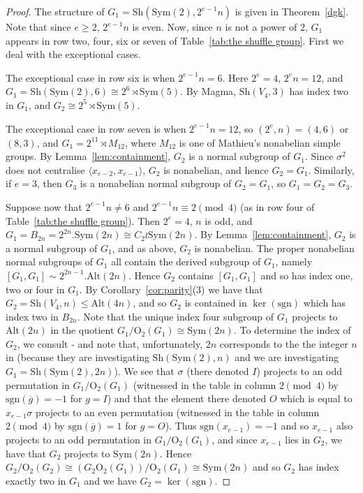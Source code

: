 \documentclass[12pt]{amsart}
\theoremstyle{remark}
\theoremstyle{definition}
\newcommand{\sym}{\mathrm{Sym}}
\newcommand{\alt}{\mathrm{Alt}}
\newcommand{\sh}{\mathrm{Sh}}
\begin{document}
\begin{proof}
The structure of $G_1= \sh(\sym(2),2^{e-1}n)$ is given in Theorem~\ref{dgk}.  Note that since $e\geqslant 2$, $2^{e-1}n$ is even. Now, since $n$ is not a power of $2$, $G_1$ appears in row two, four, six or seven of Table~\ref{tab:the shuffle group}. %
First we deal with the exceptional cases.

The exceptional case in row six  is when $2^{e-1}n=6$. Here $2^e=4$, $2^en=12$, and $G_1 = \sh(\sym(2),6) \cong 2^6 \rtimes \sym(5)$. By {\sc Magma}, $\sh(V_4,3)$ has index two in $G_1$, and $G_2 \cong 2^5 \rtimes \sym(5)$.

The exceptional case in row seven is when $2^{e-1}n = 12$, so $(2^e,n)=(4,6)$ or $(8,3)$, and $G_1= 2^{11} \rtimes M_{12}$, where $M_{12}$ is  one of  Mathieu's nonabelian simple groups. 
By Lemma~\ref{lem:containment}, $G_2$  is a normal subgroup of $G_1$.  Since $\sigma^2$ does not centralise $\langle x_{e-2}, x_{e-1}\rangle$,   $G_2$ is nonabelian, and hence $G_2=G_1$. Similarly, if $e=3$, then $G_3$ is a nonabelian normal subgroup of $G_2 = G_1$, so  $G_1 = G_2 = G_3 $.

Suppose now that $2^{e-1}n \neq 6$ and $2^{e-1}n \equiv 2 \pmod 4$ (as in row four of Table~\ref{tab:the shuffle group}). Then $2^e=4$, $n$ is odd, and $G_1 = B_{2n} = 2^{2n}.\sym(2n) \cong C_2 \wr \sym(2n)$. By Lemma~\ref{lem:containment}, $G_2$ is a normal subgroup of $G_1$, and as above, $G_2$ is nonabelian. The proper nonabelian normal subgroups of $G_1$ all contain the derived subgroup of $G_1$, namely $[G_1,G_1] \sim2^{2n-1}.\alt(2n)$. Hence $G_2$ contains $[G_1,G_1]$ and so has index one, two or four in $G_1$. By Corollary~\ref{cor:parity}(3)  we have that $G_2 = \sh(V_4,n)  \leqslant \alt(4n)$, and so $G_2$ is contained in $\ker(\mathrm{sgn})$ which has index two in $B_{2n}$. Note that the unique index four subgroup of $G_1$ projects to $\alt(2n)$ in the quotient $G_1 / \mathrm O_2(G_1) \cong \sym(2n)$. To determine the index of $G_2$, we consult \cite[Table III]{DGK} - and note that, unfortunately, $2n$ corresponds to the the integer $n$ in \cite[Table III]{DGK} (because they are investigating $\sh(\sym(2),n)$ and we are investigating $G_1 = \sh(\sym(2),2n)$). We see that $\sigma$ (there denoted $I$) projects to an odd permutation in $G_1/\mathrm O_2(G_1)$ (witnessed in the table in column $2 \pmod 4$ by $\mathrm{sgn}(\overline{g})=-1$ for $g=I$) and that the element there denoted $O$ which is equal to $ x_{e-1} \sigma$ projects to an even permutation (witnessed in the table in column $2\pmod 4$ by $\mathrm{sgn}(\overline{g})=1$ for $g=O$). Thus $\mathrm{sgn}(x_{e-1}) = -1$ and so  $x_{e-1}$ also projects to an odd permutation in $G_1/\mathrm O_2(G_1)$, and since  $x_{e-1}$ lies in $G_2$, we have that $G_2$ projects to $\sym(2n)$. Hence $G_2 / \mathrm O_2(G_2) \cong (G_2\mathrm O_2(G_1))/\mathrm O_2(G_1)  \cong \sym(2n)$ and so $G_2$ has index exactly two in $G_1$ and we have $G_2 = \ker(\mathrm{sgn})$.


\end{proof}
\end{document}
